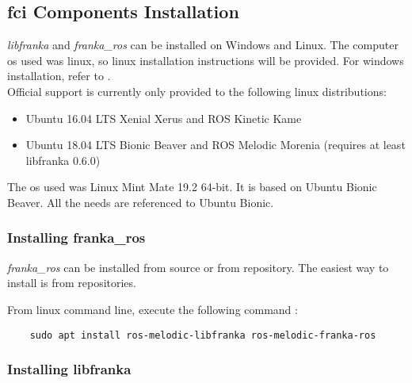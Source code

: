 \subsection{\gls{fci} Components Installation}
\label{subsec:ros_setup_robotic_system_integration_ros_installation}

 \textit{libfranka} and \textit{franka\_ros} can be installed on Windows and Linux. The computer \gls{os} used was linux, so linux installation instructions will be provided. For windows installation, refer to \cite{FrankaEmikaGmbH_fci_documentation}.\\

Official support is currently only provided to the following linux distributions:

\begin{itemize}
    \item Ubuntu 16.04 LTS Xenial Xerus and ROS Kinetic Kame
    \item Ubuntu 18.04 LTS Bionic Beaver and ROS Melodic Morenia (requires at least libfranka 0.6.0)
\end{itemize}

The \gls{os} used was Linux Mint Mate 19.2 64-bit. It is based on Ubuntu Bionic Beaver. All the needs are referenced to Ubuntu Bionic.

\subsubsection*{Installing franka\_ros}
\label{subsubsec:ros_setup_robotic_system_integration_ros_installation_franka_ros}

\textit{franka\_ros} can be installed from source or from repository. The easiest way to install is from repositories.

From linux command line, execute the following command \cite{FrankaEmikaGmbH_fci_documentation}:

\begin{verbatim}
    sudo apt install ros-melodic-libfranka ros-melodic-franka-ros
\end{verbatim}


\subsubsection*{Installing libfranka}
\label{subsubsec:ros_setup_robotic_system_integration_ros_installation_libfranka}

